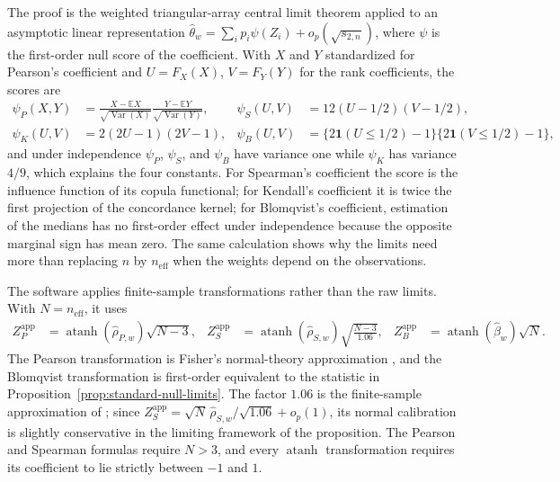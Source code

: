 The proof is the weighted triangular-array central limit theorem applied to an
asymptotic linear representation
$\widehat\theta_w=\sum_i p_i\psi(Z_i)+o_p(\sqrt{s_{2,n}})$, where $\psi$ is
the first-order null score of the coefficient. With $X$ and $Y$ standardized
for Pearson's coefficient and $U=F_X(X)$, $V=F_Y(Y)$ for the rank
coefficients, the scores are
\begin{align*}
  \psi_P(X,Y)
  &= \frac{X-\mathbb{E}X}{\sqrt{\operatorname{Var}(X)}}
     \frac{Y-\mathbb{E}Y}{\sqrt{\operatorname{Var}(Y)}},
  &
  \psi_S(U,V)
  &= 12(U-1/2)(V-1/2),\\
  \psi_K(U,V)
  &= 2(2U-1)(2V-1),
  &
  \psi_B(U,V)
  &= \{2\mathbf{1}(U\leq1/2)-1\}
     \{2\mathbf{1}(V\leq1/2)-1\},
\end{align*}
and under independence $\psi_P$, $\psi_S$, and $\psi_B$ have variance one
while $\psi_K$ has variance $4/9$, which explains the four constants. For
Spearman's coefficient the score is the influence function of its copula
functional; for Kendall's coefficient it is twice the first projection of the
concordance kernel; for Blomqvist's coefficient, estimation of the medians has
no first-order effect under independence because the opposite marginal sign
has mean zero. The same calculation shows why the limits need more than
replacing $n$ by $n_{\mathrm{eff}}$ when the weights depend on the
observations.

The software applies finite-sample transformations rather than the raw
limits. With $N=n_{\mathrm{eff}}$, it uses
\begin{align*}
  Z_P^{\mathrm{app}}
  &= \operatorname{atanh}(\widehat\rho_{P,w})\sqrt{N-3},
  &
  Z_S^{\mathrm{app}}
  &= \operatorname{atanh}(\widehat\rho_{S,w})
     \sqrt{\frac{N-3}{1.06}},
  &
  Z_B^{\mathrm{app}}
  &= \operatorname{atanh}(\widehat\beta_w)\sqrt N.
\end{align*}
The Pearson transformation is Fisher's normal-theory approximation
\citep{fisher1915}, and the Blomqvist transformation is first-order equivalent
to the statistic in Proposition~\ref{prop:standard-null-limits}. The factor
$1.06$ is the finite-sample approximation of \citet{fieller1957}; since
$Z_S^{\mathrm{app}} = \sqrt N\,\widehat\rho_{S,w}/\sqrt{1.06}+o_p(1)$, its
normal calibration is slightly conservative in the limiting framework of the
proposition. The Pearson and Spearman formulas require $N>3$, and every
$\operatorname{atanh}$ transformation requires its coefficient to lie strictly
between $-1$ and $1$.

